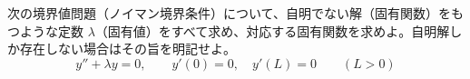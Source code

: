 
次の境界値問題（ノイマン境界条件）について、自明でない解（固有関数）をもつような定数 $\lambda$（固有値）をすべて求め、対応する固有関数を求めよ。自明解しか存在しない場合はその旨を明記せよ。
\[
y'' + \lambda y = 0, \qquad y'(0) = 0, \quad y'(L) = 0 \qquad (L > 0)
\]
